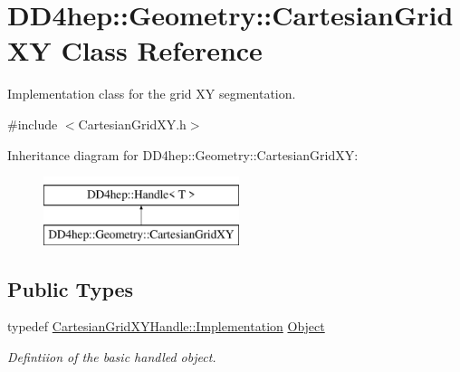 \hypertarget{class_d_d4hep_1_1_geometry_1_1_cartesian_grid_x_y}{}\section{D\+D4hep\+:\+:Geometry\+:\+:Cartesian\+Grid\+XY Class Reference}
\label{class_d_d4hep_1_1_geometry_1_1_cartesian_grid_x_y}


Implementation class for the grid XY segmentation.  




{\ttfamily \#include $<$Cartesian\+Grid\+X\+Y.\+h$>$}

Inheritance diagram for D\+D4hep\+:\+:Geometry\+:\+:Cartesian\+Grid\+XY\+:\begin{figure}[H]
\begin{center}
\leavevmode
\includegraphics[height=2.000000cm]{class_d_d4hep_1_1_geometry_1_1_cartesian_grid_x_y}
\end{center}
\end{figure}
\subsection*{Public Types}
\begin{DoxyCompactItemize}
\item 
typedef \hyperlink{class_d_d4hep_1_1_handle_ad7ff728a25806079516b8965b9113f1a}{Cartesian\+Grid\+X\+Y\+Handle\+::\+Implementation} \hyperlink{class_d_d4hep_1_1_geometry_1_1_cartesian_grid_x_y_ab59ffe7391d8eb8e0b922e7965272808}{Object}
\begin{DoxyCompactList}\small\item\em Defintiion of the basic handled object. \end{DoxyCompactList}\end{DoxyCompactItemize}
